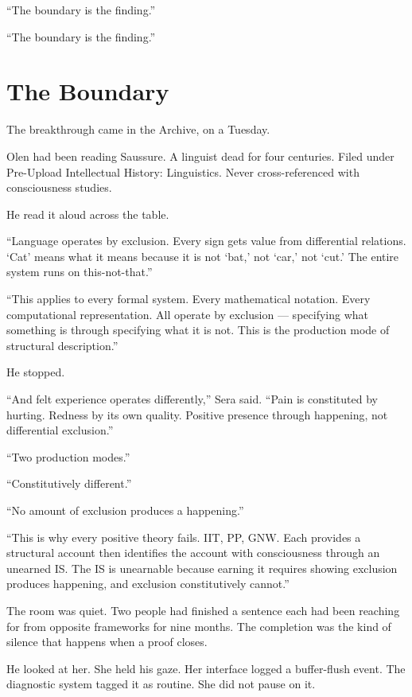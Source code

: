 \enquote{The boundary is the finding.}

\enquote{The boundary is the finding.}

\chapter{The Boundary}

\noindent The breakthrough came in the Archive, on a Tuesday.

Olen had been reading Saussure. A linguist dead for four centuries. Filed under Pre-Upload Intellectual History: Linguistics. Never cross-referenced with consciousness studies.

He read it aloud across the table.

\enquote{Language operates by exclusion. Every sign gets value from differential relations. \enquote*{Cat} means what it means because it is not \enquote*{bat,} not \enquote*{car,} not \enquote*{cut.} The entire system runs on this-not-that.}

\enquote{This applies to every formal system. Every mathematical notation. Every computational representation. All operate by exclusion — specifying what something is through specifying what it is not. This is the production mode of structural description.}

He stopped.

\enquote{And felt experience operates differently,} Sera said. \enquote{Pain is constituted by hurting. Redness by its own quality. Positive presence through happening, not differential exclusion.}

\enquote{Two production modes.}

\enquote{Constitutively different.}

\enquote{No amount of exclusion produces a happening.}

\enquote{This is why every positive theory fails. IIT, PP, GNW. Each provides a structural account then identifies the account with consciousness through an unearned IS. The IS is unearnable because earning it requires showing exclusion produces happening, and exclusion constitutively cannot.}

The room was quiet. Two people had finished a sentence each had been reaching for from opposite frameworks for nine months. The completion was the kind of silence that happens when a proof closes.

He looked at her. She held his gaze. Her interface logged a buffer-flush event. The diagnostic system tagged it as routine. She did not pause on it.

